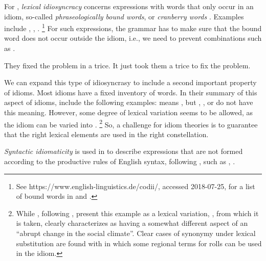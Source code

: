 \documentclass[output=paper]{langsci/langscibook}
\begin{document}
For \cite{Baldwin:Kim:10}, \emph{lexical idiosyncracy} concerns expressions with words that only occur in an idiom, so-called \emph{phraseologically bound words}, or \emph{cranberry words} \citep{Aronoff76a-u}. Examples include , , .%
\footnote{See https://www.english-linguistics.de/codii/, accessed 2018-07-25, for a list of bound words in  and  \citep{Trawinski:al:08lrec}.}
For such expressions, the grammar has to make sure that the bound word does not occur outside the idiom, i.e., we need to prevent combinations such as .

\eal \label{trice}
\ex  They fixed the problem in a trice.
\ex *It just took them a trice to fix the problem.\label{trice-ko}
\zl 

We can expand this type of idiosyncrasy to include  a second important property of idioms. 
Most idioms have a fixed inventory of words. In their summary of this aspect of idioms, \cite[--828]{Gibbs:Colston:07} include the following examples:  means , but , , or  do not have this meaning. However, some degree of lexical variation seems to be allowed, as
the idiom  can be varied into .%
\footnote{\label{fn-semmeln}While \cite{Gibbs:Colston:07}, following \cite{Gibbs:al:89}, present this example as a lexical variation, \cite[]{Glucksberg:01}, from which it is taken, clearly characterizes as having a somewhat different aspect of an ``abrupt change in the social climate''. Clear cases of synonymy under lexical substitution are found with   in which some regional terms for rolls can be used in  the idiom.}
 So, a challenge for idiom theories is to guarantee that the 
right lexical elements are used in the right constellation.

\emph{Syntactic idiomaticity} is used in \cite{Baldwin:Kim:10} to describe expressions that are not formed according to the productive rules of English syntax, following \cite{FKoC88a}, such as , .  
\end{document}

